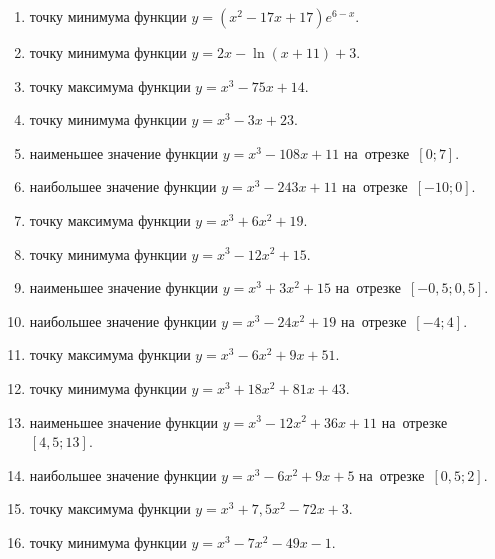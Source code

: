 \documentclass[a4paper,10pt]{article}
\begin{document}
\begin{enumerate}
\item {} точку минимума функции $y=\left(x^2-17x+17\right){{e}^{6-x}}$.

\item {} точку минимума функции $y=2x-\ln \left(x+11\right)+3$.

\item {} точку максимума функции $y=x^3 -75x +14$.

\item {} точку минимума функции $y=x^3 -3x+23$.

\item {} наименьшее значение функции $y=x^3 -108x+11$ на~отрезке~$\left[0;7\right]$.

\item {} наибольшее значение функции $y=x^3 -243x+11$ на~отрезке~$\left[-10;0\right]$.

\item {} точку максимума функции $y=x^3 +6x^2+19$.

\item {} точку минимума функции $y=x^3 -12x^2+15$.

\item {} наименьшее значение функции $y=x^3 +3x^2+15$ на~отрезке~$\left[-0,5;0,5\right]$.

\item {} наибольшее значение функции $y=x^3 -24x^2+19$ на~отрезке~$\left[-4;4\right]$.

\item {} точку максимума функции $y=x^3 -6x^2+9x+51$.

\item {} точку минимума функции $y=x^3 +18x^2+81x+43$.

\item {} наименьшее значение функции $y=x^3 -12x^2+36x+11$ на~отрезке~$\left[4,5;13\right]$.

\item {} наибольшее значение функции $y=x^3 -6x^2+9x+5$ на~отрезке~$\left[0,5;2\right]$.

\item {} точку максимума функции $y=x^3 +7,5x^2-72x+3$.

\item {} точку минимума функции $y=x^3 -7x^2-49x-1$.


\end{enumerate}
\end{document}
